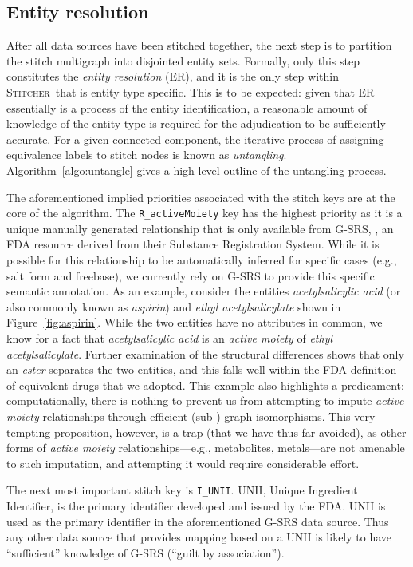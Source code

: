 \documentclass{bmcart}
\newcommand\st{\textsc{Stitcher}}
\begin{document}
\subsection*{Entity resolution}\label{sec:methods-er}
After all data sources have been stitched together, the next step is
to partition the stitch multigraph into disjointed entity sets.
Formally, only this step constitutes the \emph{entity resolution} (ER), and it is
the only step within \st\ that is entity type specific.
This is to be expected: given that ER essentially is a process of the entity
identification, a reasonable amount of knowledge of the entity type is required
for the adjudication to be sufficiently accurate. For a given connected component, 
the iterative process of assigning equivalence labels to stitch nodes is known
as \emph{untangling}. Algorithm~\ref{algo:untangle} gives a high level
outline of the untangling process.

The aforementioned implied priorities associated with the stitch keys are 
at the core of the algorithm. The \texttt{R\_activeMoiety} key has the highest
priority as it is a unique manually generated relationship that is only available from G-SRS, 
, an FDA resource derived from their Substance Registration System.
While it is possible for this relationship to be automatically inferred for specific cases
(e.g., salt form and freebase), we currently rely on G-SRS to provide this specific 
semantic annotation. As an example, consider the entities \emph{acetylsalicylic acid} 
(or also commonly known as \emph{aspirin}) and \emph{ethyl acetylsalicylate} shown in 
Figure~\ref{fig:aspirin}. While the two entities have no attributes in common, 
we know for a fact that \emph{acetylsalicylic acid} 
is an \emph{active moiety} of \emph{ethyl acetylsalicylate}. Further examination 
of the structural differences shows that only an \emph{ester} separates the two entities, 
and this falls well within the FDA definition of equivalent drugs that we adopted. 
This example also highlights a predicament: computationally, there is nothing 
to prevent us from attempting to impute \emph{active moiety} relationships through efficient (sub-) graph
isomorphisms. This very tempting proposition, however, is a trap (that we have thus
far avoided), as other forms of \emph{active moiety} relationships---e.g., metabolites, 
metals---are not amenable to such imputation, and attempting it would require considerable effort.

The next most important stitch key is \texttt{I\_UNII}. UNII, Unique Ingredient Identifier, 
is the primary identifier developed and issued by the FDA. UNII is used as the primary
identifier in the aforementioned G-SRS data source. Thus any other data source that provides
mapping based on a UNII is likely to have ``sufficient'' knowledge of G-SRS 
(``guilt by association'').   
\end{document}
